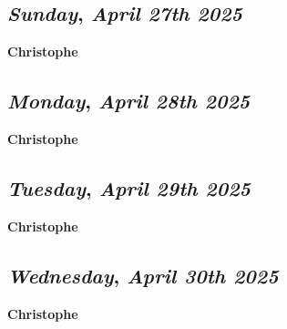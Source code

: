 \def\day{\textit{April 27th 2025}}
\def\weekday{\textit{Sunday}}
\subsection*{\weekday, \day}
\textbf {Christophe}

\def\day{\textit{April 28th 2025}}
\def\weekday{\textit{Monday}}
\subsection*{\weekday, \day}
\textbf {Christophe}

\def\day{\textit{April 29th 2025}}
\def\weekday{\textit{Tuesday}}
\subsection*{\weekday, \day}
\textbf {Christophe}

\def\day{\textit{April 30th 2025}}
\def\weekday{\textit{Wednesday}}
\subsection*{\weekday, \day}
\textbf {Christophe}
